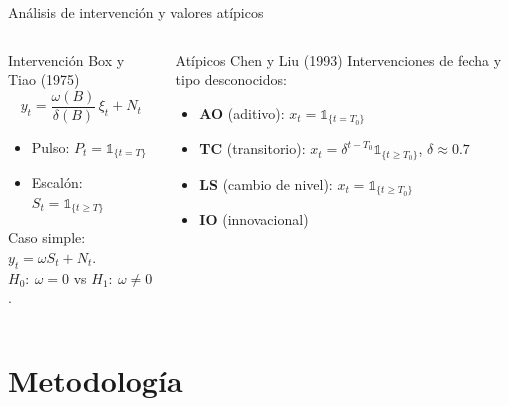 \documentclass[aspectratio=169,11pt]{beamer}
\begin{document}
\begin{frame}[t]{Análisis de intervención y valores atípicos}
  \begin{columns}[T]
    \begin{block}{Intervención \hfill{\footnotesize Box y Tiao (1975)}}
      \[
        y_t = \frac{\omega(B)}{\delta(B)}\,\xi_t + N_t
      \]
      \vspace{-3mm}
      \begin{itemize}
        \item Pulso: $P_t = \mathbb{1}_{\{t=T\}}$
        \item Escalón: $S_t = \mathbb{1}_{\{t\ge T\}}$
      \end{itemize}
      Caso simple: $y_t=\omega S_t + N_t$.\\
      $H_0:\ \omega=0$ \; vs \; $H_1:\ \omega\neq 0$.
    \end{block}
    \begin{block}{Atípicos \hfill{\footnotesize Chen y Liu (1993)}}
      Intervenciones de fecha y tipo desconocidos:
      \begin{itemize}
        \item \textbf{AO} (aditivo): $x_t=\mathbb{1}_{\{t=T_0\}}$
        \item \textbf{TC} (transitorio): $x_t=\delta^{t-T_0}\mathbb{1}_{\{t\ge T_0\}}$, $\delta\approx0.7$
        \item \textbf{LS} (cambio de nivel): $x_t=\mathbb{1}_{\{t\ge T_0\}}$
        \item \textbf{IO} (innovacional)
      \end{itemize}
    \end{block}
  \end{columns}
\end{frame}

\section{Metodología}
\end{document}
